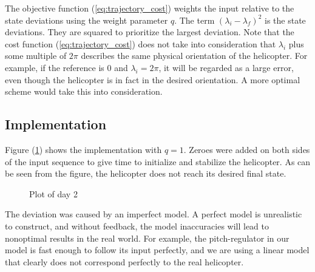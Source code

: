 The objective function (\ref{eq:trajectory_cost}) weights %
the input relative to the state deviations using the weight parameter $q$. The term $(\lambda_i - \lambda_f)^2$ is the state deviations. They are squared to prioritize the largest deviation. Note that the cost function (\ref{eq:trajectory_cost}) does not take into consideration that $\lambda_i$ plus some multiple of $2\pi$ describes the same physical orientation of the helicopter. For example, if the reference is $0$ and $\lambda_i = 2\pi$, it will be regarded as a large error, even though the helicopter is in fact in the desired orientation. A more optimal scheme would take this into consideration.


\subsection{Implementation}

Figure (\ref{fig:day2_plot}) shows the implementation with $q = 1$. Zeroes were added on both sides of the input sequence to give time to initialize and stabilize the helicopter. As can be seen from the figure, the helicopter does not reach its desired final state.

\begin{figure}[htb]
	\centering
	\caption{Plot of day 2}
	\label{fig:day2_plot}
\end{figure}

The deviation was caused by an imperfect model. A perfect model is  unrealistic to construct, and without feedback, the model inaccuracies will lead to nonoptimal results in the real world. For example, the pitch-regulator in our model is fast enough to follow its input perfectly, and we are using a linear model that clearly does not correspond perfectly to the real helicopter.
